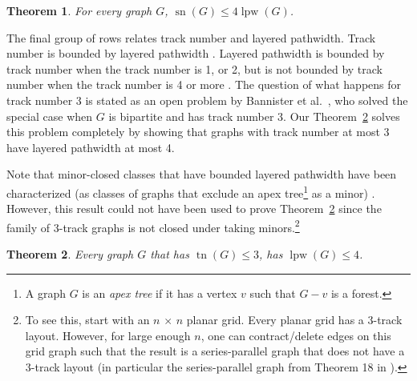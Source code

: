\documentclass{jgaa-art}
\newcommand{\etal}{et al.}
\newtheorem{thm}{Theorem}{\bfseries}{\itshape}
\newcommand{\thmlabel}[1]{\label{thm:#1}}
\newcommand{\thmref}[1]{Theorem~\ref{thm:#1}}
\DeclareMathOperator{\sn}{sn}
\DeclareMathOperator{\tr}{tn}
\DeclareMathOperator{\lpw}{lpw}
\begin{document}
\begin{thm}\thmlabel{stacknumber}
 For every graph $G$, $\sn(G)\le 4 \lpw(G)$.
\end{thm}

The final group of rows relates track number and layered pathwidth.  Track number is bounded by layered pathwidth \cite{bannister2018track}.  Layered pathwidth is bounded by track number when the track number is 1, or 2, but is not bounded by track number when the track number is 4 or more \cite{bannister2018track}.  The question of what happens for track number 3 is stated as an open problem by Bannister \etal\ \cite{bannister2018track}, who solved the special case when $G$ is bipartite and has track number 3.  Our \thmref{main} solves this problem completely by showing that graphs with track number at most 3 have layered pathwidth at most 4.

Note that minor-closed classes that have bounded layered pathwidth have been characterized (as classes of graphs that exclude an apex tree\footnote{A graph $G$ is an {\em apex tree} if it has a vertex $v$ such that $G-v$ is a forest. } as a minor) \cite{DBLP:journals/corr/abs-1810-08314}. However, this result could not have been used to prove \thmref{main} since the family of 3-track graphs is not closed under taking minors.\footnote{To see this, start with an $ n\, \times\, n$ planar grid. Every planar grid has a 3-track layout. However, for large enough $n$, one can contract/delete edges on this grid graph such that the result is a series-parallel graph that does not have a 3-track layout (in particular the series-parallel graph from Theorem 18 in \cite{bannister2018track}).}

\begin{thm}\thmlabel{main}
 Every graph $G$ that has $\tr(G)\le 3$, has $\lpw(G)\le 4$.
\end{thm}






%
%
%
%
%
%
%
\end{document}
